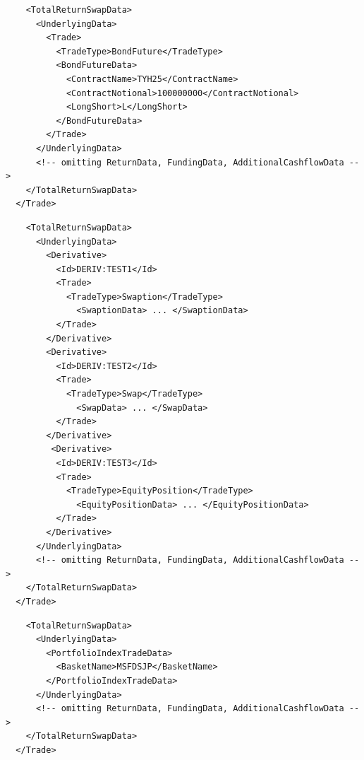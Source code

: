 \begin{listing}[H]
\begin{verbatim}
    <TotalReturnSwapData>
      <UnderlyingData>
        <Trade>
          <TradeType>BondFuture</TradeType>
          <BondFutureData>
            <ContractName>TYH25</ContractName>
            <ContractNotional>100000000</ContractNotional>
            <LongShort>L</LongShort>
          </BondFutureData>
        </Trade>
      </UnderlyingData>
      <!-- omitting ReturnData, FundingData, AdditionalCashflowData -->
    </TotalReturnSwapData>
  </Trade>
\end{verbatim}
\caption{Generic Total Return Swap with Bond Future underlying}
\label{lst:trsdata35}
\end{listing}

\begin{listing}[H]
\begin{verbatim}
    <TotalReturnSwapData>
      <UnderlyingData>
        <Derivative>
          <Id>DERIV:TEST1</Id>
          <Trade>
            <TradeType>Swaption</TradeType>
              <SwaptionData> ... </SwaptionData>
          </Trade>
        </Derivative>
        <Derivative>
          <Id>DERIV:TEST2</Id>
          <Trade>
            <TradeType>Swap</TradeType>
              <SwapData> ... </SwapData>
          </Trade>
        </Derivative> 
         <Derivative>
          <Id>DERIV:TEST3</Id>
          <Trade>
            <TradeType>EquityPosition</TradeType>
              <EquityPositionData> ... </EquityPositionData>
          </Trade>
        </Derivative>               
      </UnderlyingData>
      <!-- omitting ReturnData, FundingData, AdditionalCashflowData -->
    </TotalReturnSwapData>
  </Trade>
\end{verbatim}
\caption{Generic Total Return Swap on a Derivative underlying}
\label{lst:trsdata4}
\end{listing}

\begin{listing}[H]
\begin{verbatim}
    <TotalReturnSwapData>
      <UnderlyingData>
        <PortfolioIndexTradeData>
          <BasketName>MSFDSJP</BasketName>
        </PortfolioIndexTradeData>
      </UnderlyingData>
      <!-- omitting ReturnData, FundingData, AdditionalCashflowData -->
    </TotalReturnSwapData>
  </Trade>
\end{verbatim}
\caption{Generic Total Return Swap on a PortfolioIndexTradeData underlying}
\label{lst:trsdata_portfolio}
\end{listing}


